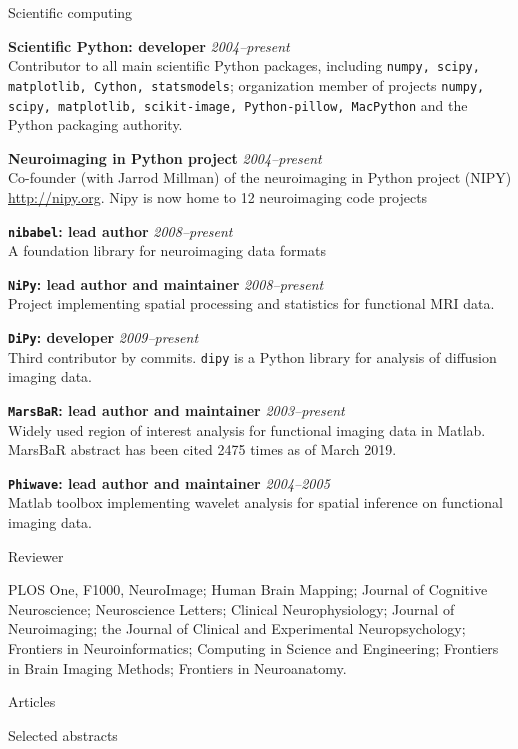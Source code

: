 \documentclass{cv}
\newcommand{\PlaceDateNote}[3]{{\bf #1} \hfill {\em #2} \\#3}
\newcommand{\Pkg}[1]{{\tt #1}}
\begin{document}
\begin{cvSection}{Scientific computing}

\PlaceDateNote{Scientific Python: developer}{2004--present}
{Contributor to all main scientific Python packages, including
    \Pkg{numpy, scipy, matplotlib, Cython, statsmodels}; organization member
    of projects \Pkg{numpy, scipy, matplotlib, scikit-image, Python-pillow,
MacPython} and the Python packaging authority.}

\PlaceDateNote{Neuroimaging in Python project}{2004--present}
{Co-founder (with Jarrod Millman) of the neuroimaging in Python project (NIPY)
    \url{http://nipy.org}.  Nipy is now home to 12 neuroimaging
    code projects}

\PlaceDateNote{\Pkg{nibabel}: lead author}{2008--present}
    {A foundation library for neuroimaging data formats}

\PlaceDateNote{\Pkg{NiPy}: lead author and maintainer}{2008--present}
    {Project implementing spatial processing and statistics for functional MRI
    data.}

\PlaceDateNote{\Pkg{DiPy}: developer}{2009--present}
    {Third contributor by commits.  \Pkg{dipy} is a Python library for
    analysis of diffusion imaging data}.

\PlaceDateNote{\Pkg{MarsBaR}: lead author and maintainer}{2003--present}
{Widely used region of interest analysis for functional
    imaging data in Matlab.  MarsBaR abstract has been
cited 2475 times as of March 2019.}

    \PlaceDateNote{\Pkg{Phiwave}: lead author and maintainer}{2004--2005}
{Matlab toolbox implementing wavelet analysis for spatial inference on
    functional imaging data.}

\end{cvSection}

\begin{cvSection}{Reviewer}

    PLOS One, F1000, NeuroImage; Human Brain Mapping; Journal of Cognitive
    Neuroscience; Neuroscience Letters; Clinical Neurophysiology; Journal of
    Neuroimaging; the Journal of Clinical and Experimental Neuropsychology;
    Frontiers in Neuroinformatics; Computing in Science and Engineering;
    Frontiers in Brain Imaging Methods; Frontiers in Neuroanatomy.

\end{cvSection}

\begin{cvSection}{Articles}

\printbibliography[heading=none,
    keyword=article,
    notkeyword=omit]

\end{cvSection}

\begin{cvSection}{Selected abstracts}

\printbibliography[heading=none,
    keyword=abstract,
    notkeyword=omit]

\end{cvSection}
\end{document}
